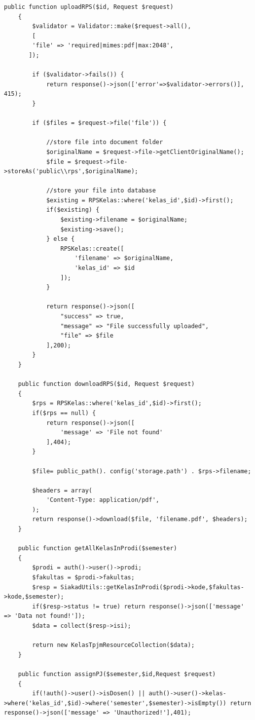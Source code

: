 \begin{lstlisting}[breaklines]
    public function uploadRPS($id, Request $request)
    {
        $validator = Validator::make($request->all(),
        [
        'file' => 'required|mimes:pdf|max:2048',
       ]);

        if ($validator->fails()) {
            return response()->json(['error'=>$validator->errors()], 415);
        }

        if ($files = $request->file('file')) {

            //store file into document folder
            $originalName = $request->file->getClientOriginalName();
            $file = $request->file->storeAs('public\\rps',$originalName);

            //store your file into database
            $existing = RPSKelas::where('kelas_id',$id)->first();
            if($existing) {
                $existing->filename = $originalName;
                $existing->save();
            } else {
                RPSKelas::create([
                    'filename' => $originalName,
                    'kelas_id' => $id
                ]);
            }

            return response()->json([
                "success" => true,
                "message" => "File successfully uploaded",
                "file" => $file
            ],200);
        }
    }

    public function downloadRPS($id, Request $request)
    {
        $rps = RPSKelas::where('kelas_id',$id)->first();
        if($rps == null) {
            return response()->json([
                'message' => 'File not found'
            ],404);
        }

        $file= public_path(). config('storage.path') . $rps->filename;

        $headers = array(
            'Content-Type: application/pdf',
        );
        return response()->download($file, 'filename.pdf', $headers);
    }

    public function getAllKelasInProdi($semester)
    {
        $prodi = auth()->user()->prodi;
        $fakultas = $prodi->fakultas;
        $resp = SiakadUtils::getKelasInProdi($prodi->kode,$fakultas->kode,$semester);
        if($resp->status != true) return response()->json(['message' => 'Data not found!']);
        $data = collect($resp->isi);

        return new KelasTpjmResourceCollection($data);
    }

    public function assignPJ($semester,$id,Request $request)
    {
        if(!auth()->user()->isDosen() || auth()->user()->kelas->where('kelas_id',$id)->where('semester',$semester)->isEmpty()) return response()->json(['message' => 'Unauthorized!'],401);


\end{lstlisting}
